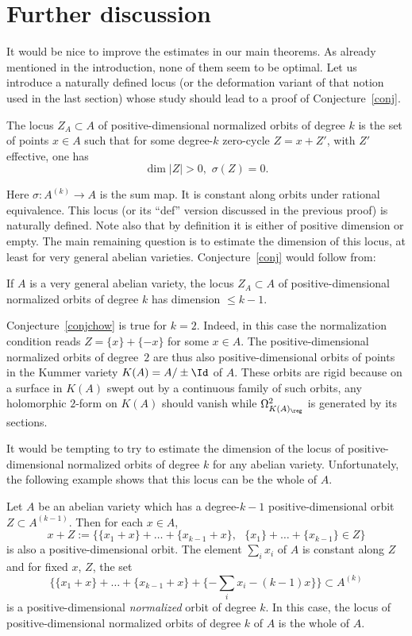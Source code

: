 \section{Further discussion}\label{secdiscussion}

It would be nice to improve the estimates in our main theorems. As already mentioned in the introduction, none of them seem to be optimal. Let us introduce a naturally defined locus (or the deformation variant of that notion used in the last section) whose study should lead to a proof of Conjecture~\ref{conj}.

\begin{defi}
The locus $Z_A\subset A$ of positive-dimensional normalized orbits of degree $k$
is the set of points $x\in A$ such that for some degree-$k$ zero-cycle $Z=x+Z'$, with $Z'$ effective, one has
\[
\dim |Z|>0,\,\,\sigma(Z)=0.
\]
\end{defi}

Here $\sigma: A^{(k)}\rightarrow A$ is the sum map. It is constant along orbits under rational equivalence. This locus (or its ``def'' version discussed in the previous proof) is naturally defined. Note also that by definition it is either of positive dimension or empty. The main remaining question is to estimate the dimension of this locus, at least for very general abelian varieties. Conjecture~\ref{conj} would follow from:

\begin{conj}\label{conjchow}
If $A$ is a very general abelian variety, the locus $Z_A\subset A$ of positive-dimensional normalized orbits of degree $k$ has dimension $\leq k-1$.
\end{conj}

Conjecture~\ref{conjchow} is true for $k=2$. Indeed, in this case the normalization condition reads $Z=\{x\}+\{-x\}$ for some $x\in A$. The positive-dimensional normalized orbits of degree~$2$ are thus also positive-dimensional orbits of points in the Kummer variety $K(A)=A/\pm \Id$ of $A$. These orbits are rigid because on a surface in $K(A)$ swept out by a continuous family of such orbits, any holomorphic $2$-form on $K(A)$ should vanish while $\Omega^2_{K(A)_{\reg}}$ is generated by its sections.

It would be tempting to try to estimate the dimension of the locus of positive-dimensional normalized orbits of degree $k$ for any abelian variety. Unfortunately, the following example shows that this locus can be the whole of $A$.

\begin{exam}\label{exanom}
Let $A$ be an abelian variety which has a degree-$k-1$
positive-dimensional orbit $Z\subset A^{(k-1)}$. Then for each $x\in A$,
\[
x+Z:=\{\{x_1+x\}+\dots+\{x_{k-1}+x\},\,\,\,\,\{x_1\}+\dots+\{x_{k-1}\}\in Z\}
\]
is also a positive-dimensional orbit. The element $\sum_ix_i$ of $A$ is constant along $Z$
and for fixed $x$, $Z$, the set
\[
\{\{x_1+x\}+\dots+\{x_{k-1}+x\}+\{-\sum_ix_i-(k-1)x\}\}\subset A^{(k)}
\]
is a positive-dimensional \emph{normalized} orbit of degree $k$.
In this case, the locus of positive-dimensional normalized orbits of degree $k$ of $A$ is the whole of $A$.
\end{exam}

